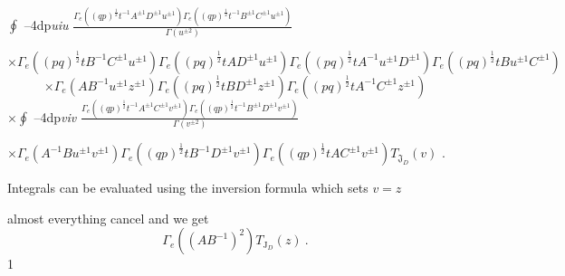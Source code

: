 \documentclass[a4paper,12pt]{article}
\begin{document}
$\displaystyle \oint$ --4dp{\it uiu} $\displaystyle \frac{\Gamma_{e}((qp)^{\frac{1}{2}}t^{-1}A^{\pm 1}D^{\pm 1}u^{\pm 1})\Gamma_{e}((qp)^{\frac{1}{2}}t^{-1}B^{\pm 1}C^{\pm 1}u^{\pm 1})}{\Gamma(u^{\pm 2})}$

$\times\Gamma_{e}((pq)^{\frac{1}{2}}tB^{-1}C^{\pm 1}u^{\pm 1})\Gamma_{e}((pq)^{\frac{1}{2}}tAD^{\pm 1}u^{\pm 1})\Gamma_{e}((pq)^{\frac{1}{2}}tA^{-1}u^{\pm 1}D^{\pm 1})\Gamma_{e}((pq)^{\frac{1}{2}}tBu^{\pm 1}C^{\pm 1})$
$$
\times\Gamma_{e}(AB^{-1}u^{\pm 1}z^{\pm 1})\Gamma_{e}((pq)^{\frac{1}{2}}tBD^{\pm 1}z^{\pm 1})\Gamma_{e}((pq)^{\frac{1}{2}}tA^{-1}C^{\pm 1}z^{\pm 1})
$$
$\displaystyle \times\oint$ --4dp{\it viv} $\displaystyle \frac{\Gamma_{e}((qp)^{\frac{1}{2}}t^{-1}A^{\pm 1}C^{\pm 1}v^{\pm 1})\Gamma_{e}((qp)^{\frac{1}{2}}t^{-1}B^{\pm 1}D^{\pm 1}v^{\pm 1})}{\Gamma(v^{\pm 2})}$

$\times\Gamma_{e}(A^{-1}Bu^{\pm 1}v^{\pm 1})\Gamma_{e}((qp)^{\frac{1}{2}}tB^{-1}D^{\pm 1}v^{\pm 1})\Gamma_{e}((qp)^{\frac{1}{2}}tAC^{\pm 1}v^{\pm 1})T_{\mathfrak{J}_{D}}(v)$ .

Integrals can be evaluated using the inversion formula which sets $v = z$

almost everything cancel and we get
$$
\Gamma_{e}((AB^{-1})^{2})T_{\mathrm{J}_{D}}(z)\ .
$$
1
\end{document}
